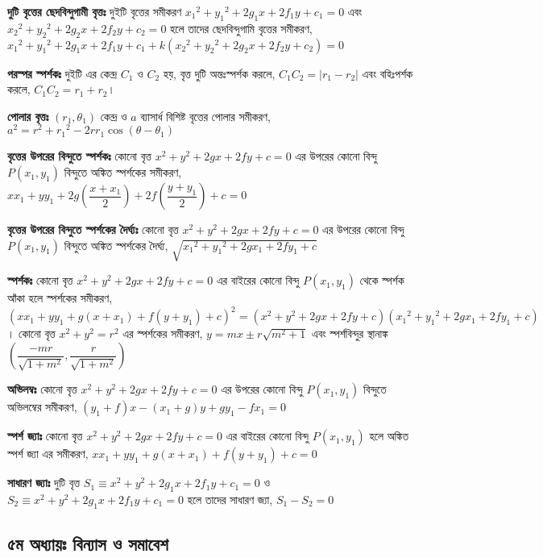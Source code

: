 \documentclass[a4paper,12pt]{article}
\newcommand{\lt}{\left}
\newcommand{\rt}{\right}
\begin{document}
\textbf{দুটি বৃত্তের ছেদবিন্দুগামী বৃত্তঃ} দুইটি বৃত্তের সমীকরণ ${x_1}^2+{y_1}^2+2g_1x+2f_1y+c_1=0$ এবং ${x_2}^2+{y_2}^2+2g_2x+2f_2y+c_2=0$ হলে তাদের ছেদবিন্দুগামি বৃত্তের সমীকরণ, ${x_1}^2+{y_1}^2+2g_1x+2f_1y+c_1+k({x_2}^2+{y_2}^2+2g_2x+2f_2y+c_2)=0$

\textbf{পরস্পর স্পর্শকঃ} দুইটি এর কেন্দ্র $C_1$ ও $C_2$ হয়, বৃত্ত দুটি অন্তঃস্পর্শক করলে, $C_1C_2=|r_1-r_2|$ এবং বহিঃপর্শক করলে, $C_1C_2=r_1+r_2$। 

\textbf{পোলার বৃত্তঃ} $(r_1, \theta_1)$ কেন্দ্র ও $a$ ব্যাসার্ধ বিশিষ্ট বৃত্তের পোলার সমীকরণ, $a^2=r^2+{r_1}^2-2rr_1\cos (\theta-\theta_1)$

\textbf{বৃত্তের উপরের বিন্দুতে স্পর্শকঃ} কোনো বৃত্ত $x^2+y^2+2gx+2fy+c=0$ এর উপরের কোনো বিন্দু $P(x_1, y_1)$ বিন্দুতে অঙ্কিত স্পর্শকের সমীকরণ, $xx_1+yy_1+2g \lt( \dfrac{x+x_1}{2}\rt)+2f \lt( \dfrac{y+y_1}{2}\rt) + c=0$

\textbf{বৃত্তের উপরের বিন্দুতে স্পর্শকের দৈর্ঘ্যঃ} কোনো বৃত্ত $x^2+y^2+2gx+2fy+c=0$ এর উপরের কোনো বিন্দু $P(x_1, y_1)$ বিন্দুতে অঙ্কিত স্পর্শকের দৈর্ঘ্য, $\sqrt{{x_1}^2+{y_1}^2+2gx_1+2fy_1+c}$

\textbf{স্পর্শকঃ} কোনো বৃত্ত $x^2+y^2+2gx+2fy+c=0$ এর বাইরের কোনো বিন্দু $P(x_1,y_1)$ থেকে স্পর্শক আঁকা হলে স্পর্শকের সমীকরণ, $(xx_1+yy_1+g(x+x_1)+f(y+y_1)+c)^2=(x^2+y^2+2gx+2fy+c)({x_1}^2+{y_1}^2+2gx_1+2fy_1+c)$। কোনো বৃত্ত $x^2+y^2=r^2$ এর স্পর্শকের সমীকরণ, $y=mx\pm r\sqrt{m^2+1}$ এবং স্পর্শবিন্দুর স্থানাঙ্ক $\lt( \dfrac{-mr}{\sqrt{1+m^2}}, \dfrac{r}{\sqrt{1+m^2}}\rt)$

\textbf{অভিলম্বঃ} কোনো বৃত্ত $x^2+y^2+2gx+2fy+c=0$ এর উপরের কোনো বিন্দু $P(x_1, y_1)$ বিন্দুতে অভিলম্বের সমীকরণ, $(y_1+f)x-(x_1+g)y+gy_1-fx_1=0$ 

\textbf{স্পর্শ জ্যাঃ} কোনো বৃত্ত $x^2+y^2+2gx+2fy+c=0$ এর বাইরের কোনো বিন্দু $P(x_1,y_1)$ হলে অঙ্কিত স্পর্শ জ্যা এর সমীকরণ, $xx_1+yy_1+g(x+x_1)+f(y+y_1)+c=0$

\textbf{সাধারণ জ্যাঃ} দুটি বৃত্ত $S_1 \equiv x^2+y^2+2g_1x+2f_1y+c_1=0$ ও $S_2 \equiv x^2+y^2+2g_1x+2f_1y+c_1=0$ হলে তাদের সাধারণ জ্যা, $S_1-S_2=0$

\subsection{৫ম অধ্যায়ঃ বিন্যাস ও সমাবেশ}
\end{document}
